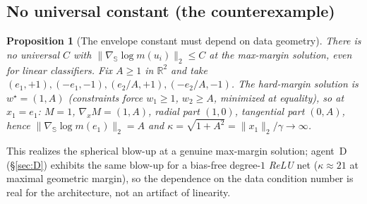 \documentclass[11pt]{article}
\newtheorem{proposition}{Proposition}
\theoremstyle{definition}
\newcommand{\R}{\mathbb{R}}
\newcommand{\Sph}{\mathbb{S}}
\newcommand{\grad}{\nabla}
\begin{document}
\subsection{No universal constant (the counterexample)}\label{sec:counter}
\begin{proposition}[The envelope constant must depend on data geometry]\label{prop:counter}
There is no universal $C$ with $\|\grad_{\Sph}\log m(u_i)\|_2\le C$ at the max-margin
solution, even for linear classifiers. Fix $A\ge1$ in $\R^2$ and take
$(e_1,+1),(-e_1,-1),(e_2/A,+1),(-e_2/A,-1)$. The hard-margin solution is
$w^\star=(1,A)$ (constraints force $w_1\ge1$, $w_2\ge A$, minimized at equality), so at
$x_1=e_1$: $M=1$, $\grad_xM=(1,A)$, radial part $(1,0)$, tangential part $(0,A)$, hence
$\|\grad_{\Sph}\log m(e_1)\|_2=A$ and $\kappa=\sqrt{1+A^2}=\|x_1\|_2/\gamma\to\infty$.
\end{proposition}
This realizes the spherical blow-up at a genuine max-margin solution; agent~D
(\S\ref{sec:D}) exhibits the same blow-up for a bias-free degree-$1$ \emph{ReLU} net
($\kappa\approx21$ at maximal geometric margin), so the dependence on the data
condition number is real for the architecture, not an artifact of linearity.
\end{document}
